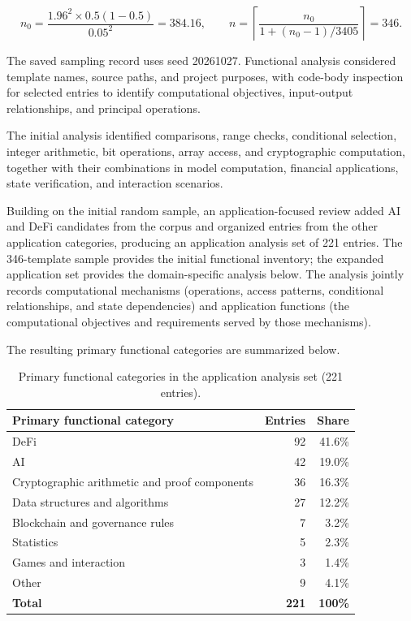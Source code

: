 \documentclass[11pt,a4paper]{article}
\begin{document}
\[
n_0=\frac{1.96^2\times0.5(1-0.5)}{0.05^2}=384.16,\qquad
n=\left\lceil\frac{n_0}{1+(n_0-1)/3405}\right\rceil=346.
\]

The saved sampling record uses seed 20261027. Functional analysis considered template names, source paths, and project purposes, with code-body inspection for selected entries to identify computational objectives, input-output relationships, and principal operations.

The initial analysis identified comparisons, range checks, conditional selection, integer arithmetic, bit operations, array access, and cryptographic computation, together with their combinations in model computation, financial applications, state verification, and interaction scenarios.

Building on the initial random sample, an application-focused review added AI and DeFi candidates from the corpus and organized entries from the other application categories, producing an application analysis set of 221 entries. The 346-template sample provides the initial functional inventory; the expanded application set provides the domain-specific analysis below. The analysis jointly records computational mechanisms (operations, access patterns, conditional relationships, and state dependencies) and application functions (the computational objectives and requirements served by those mechanisms).

The resulting primary functional categories are summarized below.

\begin{table}[!htbp]
\centering
\small
\renewcommand{\arraystretch}{1.2}
\begin{tabularx}{\linewidth}{@{}Lrr@{}}
\toprule
\textbf{Primary functional category} & \textbf{Entries} & \textbf{Share} \\
\midrule
DeFi & 92 & 41.6\% \\
AI & 42 & 19.0\% \\
Cryptographic arithmetic and proof components & 36 & 16.3\% \\
Data structures and algorithms & 27 & 12.2\% \\
Blockchain and governance rules & 7 & 3.2\% \\
Statistics & 5 & 2.3\% \\
Games and interaction & 3 & 1.4\% \\
Other & 9 & 4.1\% \\
\midrule
\textbf{Total} & \textbf{221} & \textbf{100\%} \\
\bottomrule
\end{tabularx}
\caption{Primary functional categories in the application analysis set (221 entries).}
\end{table}
\end{document}
